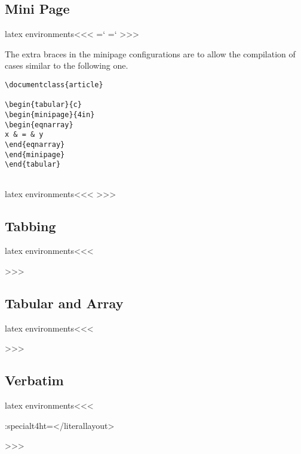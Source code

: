 \subsection{Mini Page}

\<latex environments\><<<
   {%
    {=`}\fi
   }
   {=`{\fi}%
   }
   {}{}
>>>

The extra braces in the minipage configurations are to allow the
compilation of cases similar to the following one.

\begin{verbatim}
\documentclass{article}  
    
\begin{tabular}{c}  
\begin{minipage}{4in}  
\begin{eqnarray}  
x & = & y  
\end{eqnarray}  
\end{minipage}  
\end{tabular}    
  
\end{verbatim}




\<latex environments\><<<
   {\IgnorePar\EndP{}}
   {\IgnorePar\EndP{}\ShowPar}
   {}{}
>>>

\subsection{Tabbing}

\<latex environments\><<<

>>>

\subsection{Tabular and Array}

\<latex environments\><<<

>>>

\subsection{Verbatim}

\<latex environments\><<<
  {\ifinner\else \vfill\break\fi
    \IgnorePar\EndP{}\EndNoFonts}
  {\NoFonts \ht:special{t4ht=</literallayout>}\ShowPar\par}
  {} {}
  {\ifinner\else \vfill\break\fi
    \IgnorePar\EndP{}\EndNoFonts}
  {\NoFonts {}\ShowPar\par}
  {} {}
>>>

